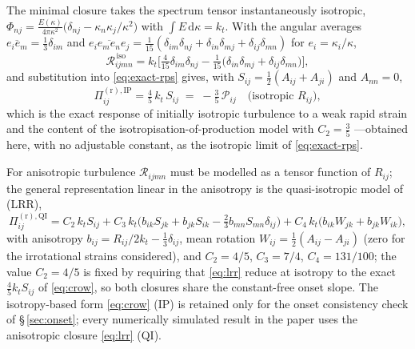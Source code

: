 \documentclass[lineno]{JFM-FLM_Au}
\begin{document}
The minimal closure takes the spectrum tensor instantaneously isotropic,
$\Phi_{nj}=\frac{E(\kappa)}{4\pi\kappa^2}
\big(\delta_{nj}-\kappa_n\kappa_j/\kappa^2\big)$ with
$\int E\,\mathrm{d}\kappa=k_t$. With the angular averages
$\overline{e_ie_m}=\tfrac13\delta_{im}$ and
$\overline{e_ie_me_ne_j}=\tfrac1{15}(\delta_{im}\delta_{nj}
+\delta_{in}\delta_{mj}+\delta_{ij}\delta_{mn})$ for
$e_i=\kappa_i/\kappa$,
\begin{equation}
  \mathcal{R}_{ijmn}^{\,\mathrm{iso}}
  = k_t\Big[\tfrac{4}{15}\delta_{im}\delta_{nj}
    -\tfrac1{15}\big(\delta_{in}\delta_{mj}
    +\delta_{ij}\delta_{mn}\big)\Big],
  \label{eq:iso-closure}
\end{equation}
and substitution into \eqref{eq:exact-rps} gives, with
$S_{ij}=\tfrac12(A_{ij}+A_{ji})$ and $A_{nn}=0$,
\begin{equation}
  \Pi^{(\mathrm r),\mathrm{IP}}_{ij}
  = \tfrac{4}{5}\,k_t\,S_{ij}
  \;=\; -\tfrac{3}{5}\,\mathcal{P}_{ij}
  \quad\text{(isotropic $R_{ij}$)},
  \label{eq:crow}
\end{equation}
which is the exact response of initially isotropic turbulence to a weak rapid
strain \citep{Crow1968} and the content of the
isotropisation-of-production model with $C_2=\tfrac35$
\citep{Pope2000}---obtained here, with no adjustable constant, as the
isotropic limit of \eqref{eq:exact-rps}.

For anisotropic turbulence $\mathcal{R}_{ijmn}$ must be modelled as a
tensor function of $R_{ij}$; the general representation linear in the
anisotropy is the quasi-isotropic model of \citet{LaunderReeceRodi1975}
(LRR),
\begin{equation}
  \Pi^{(\mathrm r),\mathrm{QI}}_{ij} = C_2\,k_t S_{ij}
  + C_3\,k_t\big(b_{ik}S_{jk}+b_{jk}S_{ik}
  -\tfrac{2}{3}b_{mn}S_{mn}\delta_{ij}\big)
  + C_4\,k_t\big(b_{ik}W_{jk}+b_{jk}W_{ik}\big),
  \label{eq:lrr}
\end{equation}
with anisotropy $b_{ij}=R_{ij}/2k_t-\tfrac13\delta_{ij}$, mean rotation
$W_{ij}=\tfrac12(A_{ij}-A_{ji})$ (zero for the irrotational strains
considered), and $C_2=4/5$, $C_3=7/4$, $C_4=131/100$; the value
$C_2=4/5$ is fixed by requiring that \eqref{eq:lrr} reduce at isotropy
to the exact $\tfrac45k_tS_{ij}$ of \eqref{eq:crow}, so both closures
share the constant-free onset slope. The isotropy-based form
\eqref{eq:crow} (IP) is retained only for the onset consistency check
of \S\,\ref{sec:onset}; every numerically simulated result in the paper
uses the anisotropic closure \eqref{eq:lrr} (QI).
\end{document}

